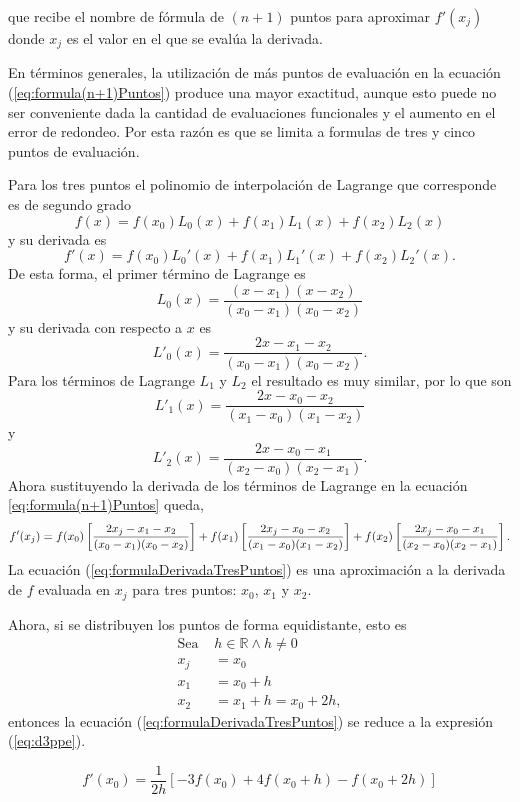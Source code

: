 que recibe el nombre de fórmula de $(n+1)$ puntos para aproximar $f'(x_j)$ donde $x_j$ es el valor en el que se evalúa la derivada.

En términos generales, la utilización de más puntos de evaluación en la ecuación (\ref{eq:formula(n+1)Puntos}) produce una mayor 
exactitud, aunque esto puede no ser conveniente dada la cantidad de evaluaciones funcionales y el aumento en el error de redondeo. 
Por esta razón es que se limita a formulas de tres y cinco puntos de evaluación. 

Para los tres puntos el polinomio de interpolación de Lagrange que corresponde es de segundo grado
\[ f(x) = f(x_0)L_0(x) + f(x_1)L_1(x) + f(x_2)L_2(x) \]
y su derivada es
\[ f'(x) = f(x_0)L_0'(x) + f(x_1)L_1'(x) + f(x_2)L_2'(x).\]
De esta forma, el primer término de Lagrange es
\[ L_0(x) = \dfrac{(x-x_1)(x-x_2)}{(x_0-x_1)(x_0-x_2)} \]
y su derivada con respecto a $x$ es
\[ L'_0(x) = \dfrac{2x-x_1-x_2}{(x_0-x_1)(x_0-x_2)}. \]
Para los términos de Lagrange $L_1$ y $L_2$ el resultado es muy similar, por lo que son 
\[ L'_1(x) = \dfrac{2x-x_0-x_2}{(x_1-x_0)(x_1-x_2)} \]
y 
\[ L'_2(x) = \dfrac{2x-x_0-x_1}{(x_2-x_0)(x_2-x_1)}. \]
Ahora sustituyendo la derivada de los términos de Lagrange en la ecuación \ref{eq:formula(n+1)Puntos} queda,
\begin{equation}
	f'(x_j) = f(x_0)\left[\dfrac{2x_j - x_1 - x_2}{(x_0-x_1)(x_0-x_2)}\right] + 
	f(x_1)\left[\dfrac{2x_j - x_0 - x_2}{(x_1-x_0)(x_1-x_2)}\right] 
	+ f(x_2)\left[{2x_j - x_0 - x_1\over (x_2-x_0)(x_2-x_1)}\right].
	\label{eq:formulaDerivadaTresPuntos}
\end{equation}
La ecuación (\ref{eq:formulaDerivadaTresPuntos}) es una aproximación a la derivada de $f$ evaluada en $x_j$ para tres puntos:
$x_0$, $x_1$ y $x_2$.

Ahora, si se distribuyen los puntos de forma equidistante, esto es 
\begin{align*}
	\mbox{Sea }& h\in\mathbb{R} \wedge h\not=0 \\
	x_j &= x_0\\
	x_1 &= x_0 + h \\ 
	x_2 &= x_1 + h = x_0+2h,
\end{align*}
entonces la ecuación (\ref{eq:formulaDerivadaTresPuntos}) se reduce a la expresión (\ref{eq:d3ppe}).

\begin{definitionT}
	\begin{equation}
		f'(x_0) = \dfrac{1}{2h}\left[-3f(x_0)+4f(x_0+h)-f(x_0+2h)\right]
		\label{eq:d3ppe}
	\end{equation}
\end{definitionT}


